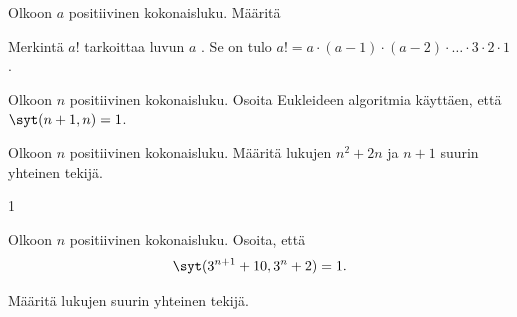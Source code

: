 \begin{tehtava}
    Olkoon $a$ positiivinen kokonaisluku. Määritä
    \begin{alakohdat}
    \end{alakohdat}
    Merkintä $a!$ tarkoittaa luvun $a$ . Se on tulo $a! = a \cdot (a-1) \cdot (a-2) \cdot \ldots \cdot 3 \cdot 2 \cdot 1$.

    \begin{vastaus}
        \begin{alakohdat}
        \end{alakohdat}
    \end{vastaus}
    
\end{tehtava}

\begin{tehtava}
    Olkoon $n$ positiivinen kokonaisluku. Osoita Eukleideen algoritmia käyttäen, että $\syt(n+1, n)=1$.
\end{tehtava}

\begin{tehtava}
    Olkoon $n$ positiivinen kokonaisluku. Määritä lukujen $n^2 + 2n$ ja $n + 1$ suurin yhteinen tekijä.
    
    \begin{vastaus}
        1
    \end{vastaus}
    
\end{tehtava}

\begin{tehtava}
    Olkoon $n$ positiivinen kokonaisluku. Osoita, että
    \[\syt(3^{n+1} + 10, 3^n + 2)=1.\]
\end{tehtava}

\begin{tehtava}
    Määritä lukujen suurin yhteinen tekijä.
    
    \begin{alakohdat}
    \end{alakohdat}

    \begin{vastaus}
        \begin{alakohdat}
        \end{alakohdat}
    \end{vastaus}
    
\end{tehtava}


